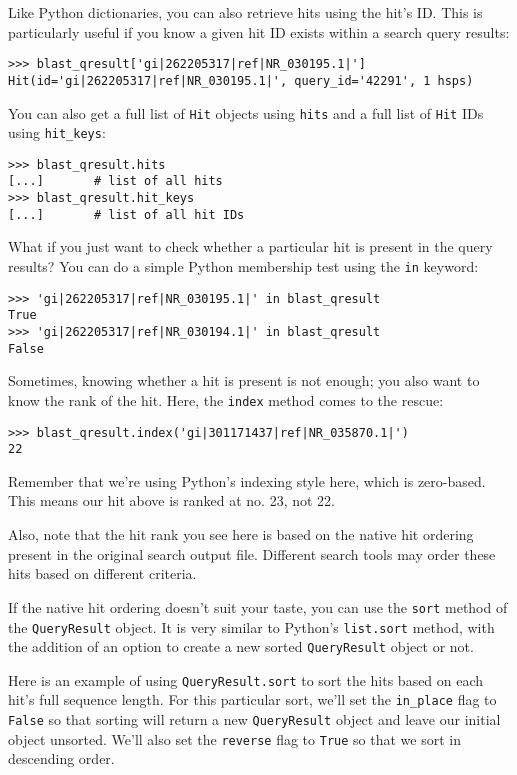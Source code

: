 \documentclass{report}
\begin{document}
Like Python dictionaries, you can also retrieve hits using the hit's ID. This is
particularly useful if you know a given hit ID exists within a search query
results:

\begin{verbatim}
>>> blast_qresult['gi|262205317|ref|NR_030195.1|']
Hit(id='gi|262205317|ref|NR_030195.1|', query_id='42291', 1 hsps)
\end{verbatim}

You can also get a full list of \verb|Hit| objects using \verb|hits| and a full
list of \verb|Hit| IDs using \verb|hit_keys|:

\begin{verbatim}
>>> blast_qresult.hits
[...]       # list of all hits
>>> blast_qresult.hit_keys
[...]       # list of all hit IDs
\end{verbatim}

What if you just want to check whether a particular hit is present in the query
results? You can do a simple Python membership test using the \verb|in| keyword:

\begin{verbatim}
>>> 'gi|262205317|ref|NR_030195.1|' in blast_qresult
True
>>> 'gi|262205317|ref|NR_030194.1|' in blast_qresult
False
\end{verbatim}

Sometimes, knowing whether a hit is present is not enough; you also want to know
the rank of the hit. Here, the \verb|index| method comes to the rescue:

\begin{verbatim}
>>> blast_qresult.index('gi|301171437|ref|NR_035870.1|')
22
\end{verbatim}

Remember that we're using Python's indexing style here, which is zero-based.
This means our hit above is ranked at no. 23, not 22.

Also, note that the hit rank you see here is based on the native hit ordering
present in the original search output file. Different search tools may order
these hits based on different criteria.

If the native hit ordering doesn't suit your taste, you can use the \verb|sort|
method of the \verb|QueryResult| object. It is very similar to Python's
\verb|list.sort| method, with the addition of an option to create a new sorted
\verb|QueryResult| object or not.

Here is an example of using \verb|QueryResult.sort| to sort the hits based on
each hit's full sequence length. For this particular sort, we'll set the
\verb|in_place| flag to \verb|False| so that sorting will return a new
\verb|QueryResult| object and leave our initial object unsorted. We'll also set
the \verb|reverse| flag to \verb|True| so that we sort in descending order.
\end{document}
